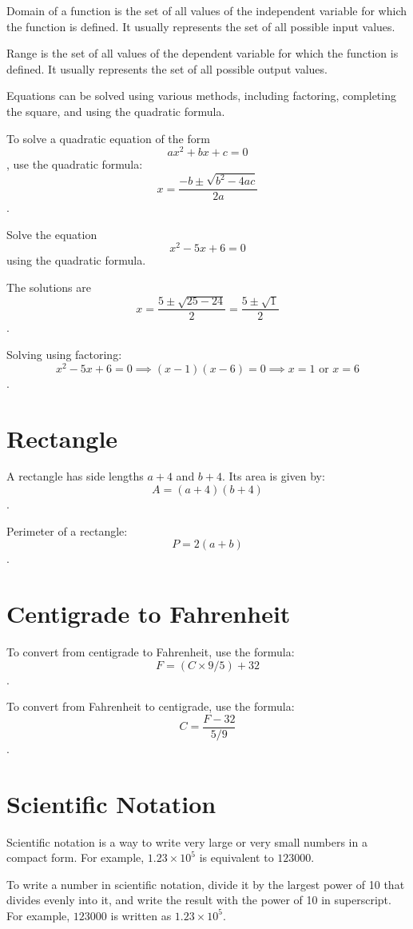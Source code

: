 \documentclass{article}
\begin{document}
Domain of a function is the set of all values of the independent variable for which the function is defined. It usually represents the set of all possible input values.

Range is the set of all values of the dependent variable for which the function is defined. It usually represents the set of all possible output values.

\vspace{1cm}

Equations can be solved using various methods, including factoring, completing the square, and using the quadratic formula.

To solve a quadratic equation of the form $$ax^2 + bx + c = 0$$, use the quadratic formula: $$x = \frac{-b \pm \sqrt{b^2 - 4ac}}{2a}$$.

Solve the equation $$x^2 - 5x + 6 = 0$$ using the quadratic formula.

The solutions are $$x = \frac{5 \pm \sqrt{25 - 24}}{2} = \frac{5 \pm \sqrt{1}}{2}$$.


Solving using factoring: $$x^2 - 5x + 6 = 0 \implies (x-1)(x-6) = 0 \implies x = 1 \text{ or } x = 6$$.

\section{Rectangle}
A rectangle has side lengths $a+4$ and $b+4$. Its area is given by: $$A = (a+4)(b+4)$$.

Perimeter of a rectangle: $$P = 2(a+b)$$.

\section{Centigrade to Fahrenheit}

To convert from centigrade to Fahrenheit, use the formula: $$F = (C \times 9/5) + 32$$.

To convert from Fahrenheit to centigrade, use the formula: $$C = \frac{F - 32}{5/9}$$.

\section{Scientific Notation}

Scientific notation is a way to write very large or very small numbers in a compact form. For example, $1.23 \times 10^5$ is equivalent to $123000$.

To write a number in scientific notation, divide it by the largest power of 10 that divides evenly into it, and write the result with the power of 10 in superscript. For example, $123000$ is written as $1.23 \times 10^5$.
\end{document}
